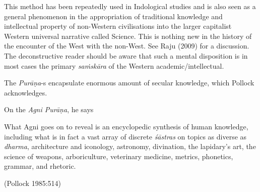 This method has been repeatedly used in Indological studies and is also seen as a general phenomenon in the appropriation of traditional knowledge and intellectual property of non-Western civilisations into the larger capitalist Western universal narrative called Science. This is nothing new in the history of the encounter of the West with the non-West. See Raju (2009) for a discussion. The deconstructive reader should be aware that such a mental disposition is in most cases the primary {\sl saṁskāra} of the Western academic/intellectual.

The {\sl Purāṇa}-s encapsulate enormous amount of secular knowledge, which Pollock acknowledges.

On the {\sl Agni Purāṇa}, he says
\begin{myquote}
What Agni goes on to reveal is an encyclopedic synthesis of human knowledge, including what is in fact a vast array of discrete {\sl śāstras} on topics as diverse as {\sl dharma}, architecture and iconology, astronomy, divination, the lapidary's art, the science of weapons, arboriculture, veterinary medicine, metrics, phonetics, grammar, and rhetoric.

\hfill (Pollock 1985:514)
\end{myquote}

